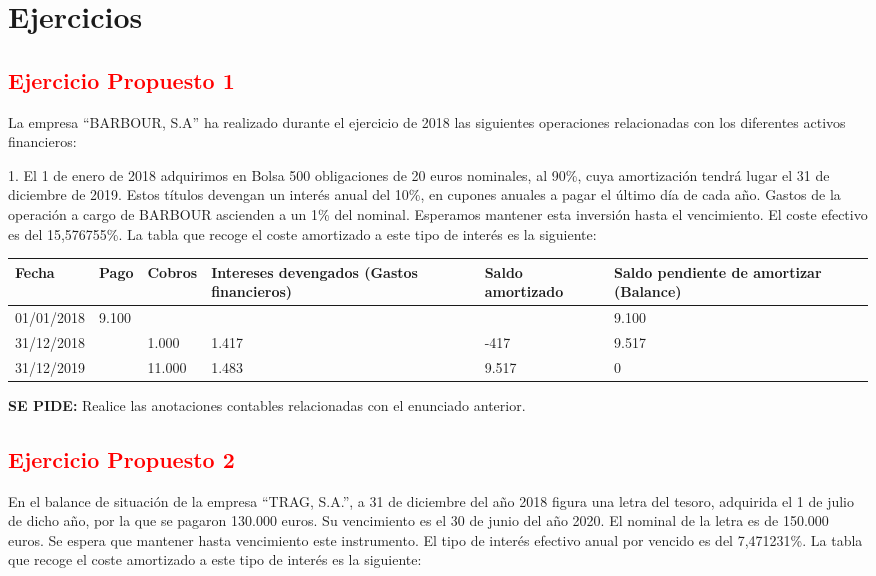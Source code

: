 \section{Ejercicios}

\subsection*{\textcolor{red}{Ejercicio Propuesto 1}}

La empresa “BARBOUR, S.A” ha realizado durante el ejercicio de 2018 las siguientes operaciones relacionadas con los diferentes activos financieros:

1. El 1 de enero de 2018 adquirimos en Bolsa 500 obligaciones de 20 euros nominales, al 90\%, cuya amortización tendrá lugar el 31 de diciembre de 2019. Estos títulos devengan un interés anual del 10\%, en cupones anuales a pagar el último día de cada año. Gastos de la operación a cargo de BARBOUR ascienden a un 1\% del nominal. Esperamos mantener esta inversión hasta el vencimiento. El coste efectivo es del 15,576755\%. La tabla que recoge el coste amortizado a este tipo de interés es la siguiente:

\begin{table}[H]
    \centering
    \begin{tabular}{|p{3cm}|p{2cm}|p{2cm}|p{2cm}|p{2cm}|p{2cm}|}
        \hline
        \textbf{Fecha} & \textbf{Pago} & \textbf{Cobros} & \textbf{Intereses devengados (Gastos financieros)} & \textbf{Saldo amortizado} & \textbf{Saldo pendiente de amortizar (Balance)} \\
        \hline
        01/01/2018 & 9.100 & & & & 9.100 \\
        \hline
        31/12/2018 & & 1.000 & 1.417 & -417 & 9.517 \\
        \hline
        31/12/2019 & & 11.000 & 1.483 & 9.517 & 0 \\
        \hline
    \end{tabular}
\end{table}

\textbf{SE PIDE:} Realice las anotaciones contables relacionadas con el enunciado anterior.

\subsection*{\textcolor{red}{Ejercicio Propuesto 2}}

En el balance de situación de la empresa “TRAG, S.A.”, a 31 de diciembre del año 2018 figura una letra del tesoro, adquirida el 1 de julio de dicho año, por la que se pagaron 130.000 euros. Su vencimiento es el 30 de junio del año 2020. El nominal de la letra es de 150.000 euros. Se espera que mantener hasta vencimiento este instrumento. El tipo de interés efectivo anual por vencido es del 7,471231\%. La tabla que recoge el coste amortizado a este tipo de interés es la siguiente:

